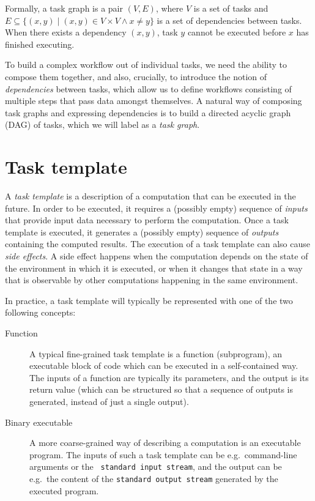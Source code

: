 Formally, a task graph is a pair $(V, E)$, where $V$ is a set of
tasks and $E \subseteq \{(x, y) \mid (x, y) \in V\times{}V \land x \neq y \}$ is a set of dependencies between tasks. When there exists a
dependency $(x, y)$, task $y$ cannot be executed before
$x$ has finished executing.


To build a complex workflow out of individual tasks, we need the ability to compose them together,
and also, crucially, to introduce the notion of \emph{dependencies} between tasks, which allow
us to define workflows consisting of multiple steps that pass data amongst themselves. A natural
way of composing task graphs and expressing dependencies is to build a directed acyclic graph (DAG)
of tasks, which we will label as a \emph{task graph}.



\section{Task template}
A \emph{task template} is a description of a computation that can be executed in the future. In
order to be executed, it requires a (possibly empty) sequence of \emph{inputs} that
provide input data necessary to perform the computation. Once a task template is executed, it
generates a (possibly empty) sequence of \emph{outputs} containing the computed results.
The execution of a task template can also cause \emph{side effects}. A side effect happens when
the computation depends on the state of the environment in which it is executed, or when it changes
that state in a way that is observable by other computations happening in the same environment.

In practice, a task template will typically be represented with one of the two following concepts:
\begin{description}
	\item[Function] A typical fine-grained task template is a function (subprogram), an executable block of code which
		can be executed in a self-contained way. The inputs of a function are typically its parameters, and
		the output is its return value (which can be structured so that a sequence of outputs is generated,
		instead of just a single output).
	\item[Binary executable] A more coarse-grained way of describing a computation is an executable program. The inputs of such
		a task template can be e.g.\ command-line arguments or the \texttt{
		standard input stream}, and the output
		can be e.g.\ the content of the \texttt{standard output stream} generated by the executed program.
\end{description}

